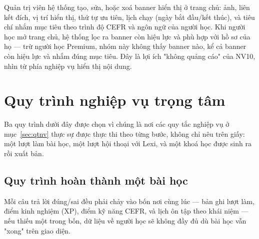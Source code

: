 Quản trị viên hệ thống tạo, sửa, hoặc xoá banner hiển thị ở trang chủ: ảnh, liên kết đích,
vị trí hiển thị, thứ tự ưu tiên, lịch chạy (ngày bắt đầu/kết thúc), và tiêu chí nhắm mục
tiêu theo trình độ CEFR và ngôn ngữ của người học. Khi người học mở trang chủ, hệ thống lọc
ra banner còn hiệu lực và phù hợp với hồ sơ của họ — trừ người học Premium, nhóm này không
thấy banner nào, kể cả banner còn hiệu lực và nhắm đúng mục tiêu. Đây là lợi ích "không
quảng cáo" của NV10, nhìn từ phía nghiệp vụ hiển thị nội dung.

\section{Quy trình nghiệp vụ trọng tâm}

Ba quy trình dưới đây được chọn vì chúng là nơi các quy tắc nghiệp vụ ở mục~\ref{sec:qtnv}
thực sự được thực thi theo từng bước, không chỉ nêu trên giấy: một lượt làm bài học, một
lượt hội thoại với Lexi, và một khoá học được sinh ra rồi xuất bản.

\subsection{Quy trình hoàn thành một bài học}

Mỗi câu trả lời đúng/sai đều phải chảy vào bốn nơi cùng lúc — bản ghi lượt làm, điểm kinh
nghiệm (XP), điểm kỹ năng CEFR, và lịch ôn tập theo khái niệm — nếu thiếu một trong bốn,
dữ liệu về người học sẽ không đầy đủ dù bài học vẫn "xong" trên giao diện.

